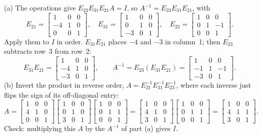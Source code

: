 \begin{solution}
(a) The operations give $E_{23}E_{31}E_{21}A=I$, so $A^{-1}=E_{23}E_{31}E_{21}$, with
\[
  E_{21}=\begin{bmatrix}1&0&0\\-4&1&0\\0&0&1\end{bmatrix},\quad
  E_{31}=\begin{bmatrix}1&0&0\\0&1&0\\-3&0&1\end{bmatrix},\quad
  E_{23}=\begin{bmatrix}1&0&0\\0&1&-1\\0&0&1\end{bmatrix}.
\]
Apply them to $I$ in order. $E_{31}E_{21}$ places $-4$ and $-3$ in column~1; then $E_{23}$
subtracts row~3 from row~2:
\[
  E_{31}E_{21}=\begin{bmatrix}1&0&0\\-4&1&0\\-3&0&1\end{bmatrix},\qquad
  A^{-1}=E_{23}(E_{31}E_{21})=\begin{bmatrix}1&0&0\\-1&1&-1\\-3&0&1\end{bmatrix}.
\]
(b) Invert the product in reverse order, $A=E_{21}^{-1}E_{31}^{-1}E_{23}^{-1}$, where each
inverse just flips the sign of its off-diagonal entry:
\[
  A=\begin{bmatrix}1&0&0\\4&1&0\\0&0&1\end{bmatrix}
    \begin{bmatrix}1&0&0\\0&1&0\\3&0&1\end{bmatrix}
    \begin{bmatrix}1&0&0\\0&1&1\\0&0&1\end{bmatrix}
   =\begin{bmatrix}1&0&0\\4&1&0\\3&0&1\end{bmatrix}
    \begin{bmatrix}1&0&0\\0&1&1\\0&0&1\end{bmatrix}
   =\begin{bmatrix}1&0&0\\4&1&1\\3&0&1\end{bmatrix}.
\]
Check: multiplying this $A$ by the $A^{-1}$ of part (a) gives $I$.


\end{solution}

